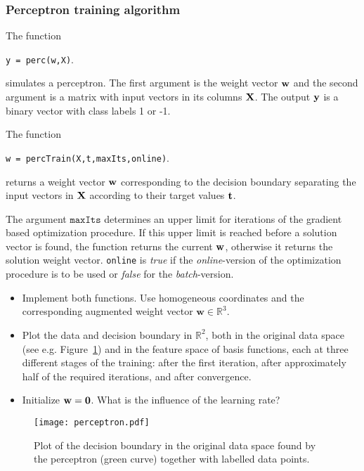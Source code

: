 \documentclass[a4]{article}
\begin{document}
\subsubsection{Perceptron training algorithm}
The function
\begin{center}
\texttt{y = perc(w,X)}.
\end{center}
simulates a perceptron. The first argument is the weight vector ${\bf w}$ and the second argument is a matrix with input vectors in its columns ${\bf X}$. The output ${\bf y}$ is a binary vector with class labels 1 or -1.

The function 
\begin{center}
\texttt{w = percTrain(X,t,maxIts,online)}.
\end{center} 
returns a weight vector ${\bf w}$ corresponding to the decision boundary separating the input vectors in ${\bf X}$ according to their target values ${\bf t}$.

The argument $\texttt{maxIts}$ determines an upper limit for iterations of the gradient based optimization procedure. If this upper limit is reached before a solution vector is found, the function returns the current ${\bf w}$, otherwise it returns the solution weight vector. \texttt{online} is \emph{true} if the \emph{online}-version of the optimization procedure is to be used or \emph{false} for the \emph{batch}-version. 
\vspace{2mm}

\begin{itemize}
\item Implement both functions. Use homogeneous coordinates and the corresponding augmented weight vector ${\mathbf w}\in\mathbb{R}^3$.
\item Plot the data and decision boundary in $\mathbb{R}^2$, both in the original data space (see e.g. Figure~\ref{fig:perceptron}) and in the feature space of basis functions, each at three different stages of the training: after the first iteration, after approximately half of the required iterations, and after convergence. 
\item Initialize ${\bf w} = {\bf 0}$. What is the influence of the learning rate?
\end{itemize}

\begin{figure}[!h]
\begin{center}
\centering
	\texttt{[image: perceptron.pdf]}
\end{center}
\caption{\label{fig:perceptron}Plot of the decision boundary in the original data space found by the perceptron (green curve) together with labelled data points.}
\end{figure}
\end{document}
